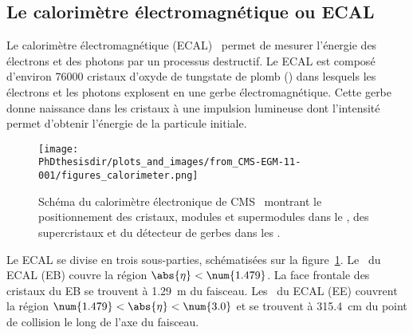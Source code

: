 \subsection{Le calorimètre électromagnétique ou ECAL}\label{chapter-LHC-section-CMS-subsec-ECAL}
Le calorimètre électromagnétique (ECAL)~\cite{cms_paper,CERN-LHCC-97-033,CMS-EGM-11-001,CMS-DP-2019-005,CMS-DP-2020-021} permet de mesurer l'énergie des électrons et des photons par un processus destructif.
Le ECAL est composé d'environ \num{76000} cristaux d'oxyde de tungstate de plomb () dans lesquels les électrons et les photons explosent en une gerbe électromagnétique.
Cette gerbe donne naissance dans les cristaux à une impulsion lumineuse dont l'intensité permet d'obtenir l'énergie de la particule initiale.
\begin{figure}[b]
\centering
\texttt{[image: \\PhDthesisdir/plots\_and\_images/from\_CMS-EGM-11-001/figures\_calorimeter.png]}
\caption[Schéma du calorimètre électronique de CMS.]{Schéma du calorimètre électronique de CMS~\cite{cms_paper,CMS-EGM-11-001} montrant le positionnement des cristaux, modules et supermodules dans le \CMSbarrel, des supercristaux et du détecteur de gerbes dans les \CMSendcaps.}
\label{fig-chapter-LHC-section-CMS-subsec-ECAL-CMS-EGM-11-001-figures_calorimeter}
\end{figure}
\par Le ECAL se divise en trois sous-parties, schématisées sur la figure~\ref{fig-chapter-LHC-section-CMS-subsec-ECAL-CMS-EGM-11-001-figures_calorimeter}.
Le \CMSbarrel\ du ECAL (EB) couvre la région $\abs{\eta}<\num{1.479}$.
La face frontale des cristaux du EB se trouvent à \SI{1.29}{\meter} du faisceau.
Les \CMSendcaps\ du ECAL (EE) couvrent la région $\num{1.479}<\abs{\eta}<\num{3.0}$ et se trouvent à \SI{315.4}{\centi\meter} du point de collision le long de l'axe du faisceau.
